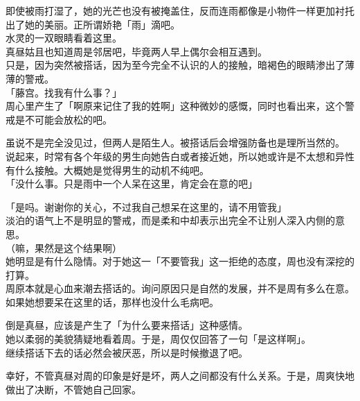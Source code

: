 即使被雨打湿了，她的光芒也没有被掩盖住，反而连雨都像是小物件一样更加衬托出了她的美丽。正所谓娇艳「雨」滴吧。\\

水灵的一双眼睛看着这里。\\

真昼姑且也知道周是邻居吧，毕竟两人早上偶尔会相互遇到。\\

只是，因为突然被搭话，因为至今完全不认识的人的接触，暗褐色的眼睛渗出了薄薄的警戒。\\

「藤宫。找我有什么事？」\\

周心里产生了「啊原来记住了我的姓啊」这种微妙的感慨，同时也看出来，这个警戒是不可能会放松的吧。

虽说不是完全没见过，但两人是陌生人。被搭话后会增强防备也是理所当然的。\\

说起来，时常有各个年级的男生向她告白或者接近她，所以她或许是不太想和异性有什么接触。大概她是觉得男生的动机不纯吧。\\

「没什么事。只是雨中一个人呆在这里，肯定会在意的吧」

「是吗。谢谢你的关心，不过我自己想呆在这里的，请不用管我」\\

淡泊的语气上不是明显的警戒，而是柔和中却表示出完全不让别人深入内侧的意思。\\

（嘛，果然是这个结果啊）\\

她明显是有什么隐情。对于她这一「不要管我」这一拒绝的态度，周也没有深挖的打算。\\

周原本就是心血来潮去搭话的。询问原因只是自然的发展，并不是周有多么在意。\\

如果她想要呆在这里的话，那样也没什么毛病吧。

倒是真昼，应该是产生了「为什么要来搭话」这种感情。\\

她以柔弱的美貌猜疑地看着周。于是，周仅仅回答了一句「是这样啊」。\\

继续搭话下去的话必然会被厌恶，所以是时候撤退了吧。

幸好，不管真昼对周的印象是好是坏，两人之间都没有什么关系。于是，周爽快地做出了决断，不管她自己回家。\\

